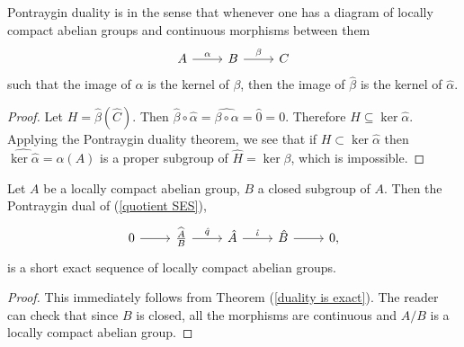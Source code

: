 \begin{theorem}
\label{duality is exact}
Pontraygin duality is  in the sense that whenever one has a diagram of locally compact abelian groups and continuous morphisms between them
$$\begin{tikzcd}
A \arrow[r,"\alpha"] & B \arrow[r, "\beta"] & C
\end{tikzcd}
$$
such that the image of $\alpha$ is the kernel of $\beta$, then the image of $\hat \beta$ is the kernel of $\hat \alpha$.
\end{theorem}
\begin{proof}
Let $H = \hat \beta(\hat C)$. Then $\hat \beta \circ \hat \alpha = \widehat{\beta \circ \alpha} = \hat 0 = 0$. Therefore $H \subseteq \ker \hat \alpha$.
Applying the Pontraygin duality theorem, we see that if $H \subset \ker \hat \alpha$ then $\widehat{\ker \hat \alpha} = \alpha(A)$ is a proper subgroup of $\hat H = \ker \beta$, which is impossible.
\end{proof}

\begin{corollary}
\label{duality is exact 2}
Let $A$ be a locally compact abelian group, $B$ a closed subgroup of $A$.
Then the Pontraygin dual of (\ref{quotient SES}),
$$
\begin{tikzcd}
0 \arrow[r] & \widehat{\frac{A}{B}} \arrow[r,"\hat q"] & \hat A \arrow[r,"\hat \iota"] & \hat B \arrow[r] & 0,
\end{tikzcd}$$
is a short exact sequence of locally compact abelian groups.
\end{corollary}
\begin{proof}
This immediately follows from Theorem (\ref{duality is exact}).
The reader can check that since $B$ is closed, all the morphisms are continuous and $A/B$ is a locally compact abelian group.
\end{proof}


